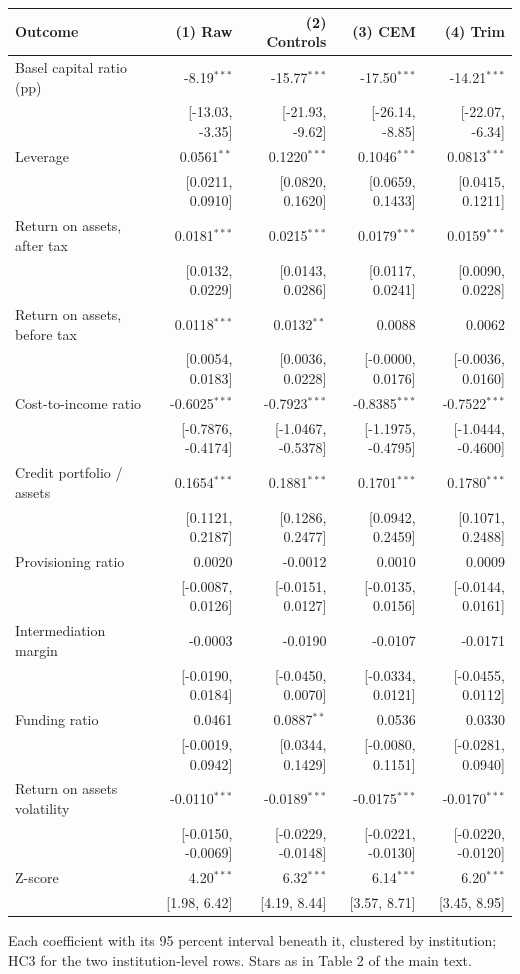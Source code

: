 \footnotesize
\setlength{\tabcolsep}{4pt}
\begin{tabular}{lrrrr}
\toprule
Outcome & (1) Raw & (2) Controls & (3) CEM & (4) Trim \\
\midrule
Basel capital ratio (pp) & -8.19$^{***}$ & -15.77$^{***}$ & -17.50$^{***}$ & -14.21$^{***}$ \\
 & [-13.03, -3.35] & [-21.93, -9.62] & [-26.14, -8.85] & [-22.07, -6.34] \\
Leverage & 0.0561$^{**}$ & 0.1220$^{***}$ & 0.1046$^{***}$ & 0.0813$^{***}$ \\
 & [0.0211, 0.0910] & [0.0820, 0.1620] & [0.0659, 0.1433] & [0.0415, 0.1211] \\
Return on assets, after tax & 0.0181$^{***}$ & 0.0215$^{***}$ & 0.0179$^{***}$ & 0.0159$^{***}$ \\
 & [0.0132, 0.0229] & [0.0143, 0.0286] & [0.0117, 0.0241] & [0.0090, 0.0228] \\
Return on assets, before tax & 0.0118$^{***}$ & 0.0132$^{**}$ & 0.0088 & 0.0062 \\
 & [0.0054, 0.0183] & [0.0036, 0.0228] & [-0.0000, 0.0176] & [-0.0036, 0.0160] \\
Cost-to-income ratio & -0.6025$^{***}$ & -0.7923$^{***}$ & -0.8385$^{***}$ & -0.7522$^{***}$ \\
 & [-0.7876, -0.4174] & [-1.0467, -0.5378] & [-1.1975, -0.4795] & [-1.0444, -0.4600] \\
Credit portfolio / assets & 0.1654$^{***}$ & 0.1881$^{***}$ & 0.1701$^{***}$ & 0.1780$^{***}$ \\
 & [0.1121, 0.2187] & [0.1286, 0.2477] & [0.0942, 0.2459] & [0.1071, 0.2488] \\
Provisioning ratio & 0.0020 & -0.0012 & 0.0010 & 0.0009 \\
 & [-0.0087, 0.0126] & [-0.0151, 0.0127] & [-0.0135, 0.0156] & [-0.0144, 0.0161] \\
Intermediation margin & -0.0003 & -0.0190 & -0.0107 & -0.0171 \\
 & [-0.0190, 0.0184] & [-0.0450, 0.0070] & [-0.0334, 0.0121] & [-0.0455, 0.0112] \\
Funding ratio & 0.0461 & 0.0887$^{**}$ & 0.0536 & 0.0330 \\
 & [-0.0019, 0.0942] & [0.0344, 0.1429] & [-0.0080, 0.1151] & [-0.0281, 0.0940] \\
\midrule
Return on assets volatility & -0.0110$^{***}$ & -0.0189$^{***}$ & -0.0175$^{***}$ & -0.0170$^{***}$ \\
 & [-0.0150, -0.0069] & [-0.0229, -0.0148] & [-0.0221, -0.0130] & [-0.0220, -0.0120] \\
Z-score & 4.20$^{***}$ & 6.32$^{***}$ & 6.14$^{***}$ & 6.20$^{***}$ \\
 & [1.98, 6.42] & [4.19, 8.44] & [3.57, 8.71] & [3.45, 8.95] \\
\bottomrule
\end{tabular}
\begin{tablenotes}[flushleft]\footnotesize
\item Each coefficient with its 95 percent interval beneath it, clustered by institution; HC3 for the two institution-level rows. Stars as in Table 2 of the main text.
\end{tablenotes}
